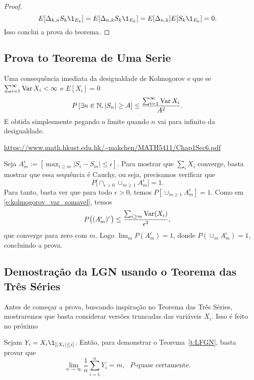 \begin{topics}
\begin{proof}
 \begin{equation}
   E[ \Delta_{k,n} S_k \1_{E_k}]=E[\Delta_{n,k}S_k \1_{E_k}]=E[\Delta_{n,k}]E[S_k \1_{E_k}]=0.
 \end{equation}
 Isso conclui a prova do teorema.
\end{proof}

\subsection{Prova to Teorema de Uma Serie}

Uma consequência imediata da desigualdade de Kolmogorov e que se \\ $\sum_{i=1}^{\infty} \operatorname{Var} X_i<\infty$ e $E[X_i]=0$
\begin{equation}
  \label{e:kolmogorov_var_somavel}
  P\left[ \exists n\in {\ensuremath{\mathbb N}},  |S_n| \ge A \right]
  \le \frac{\sum_{i=1}^{\infty} \operatorname{Var} X_i}{A^2}.
\end{equation}
E obtida simplesmente pegando o limite quando $n$ vai para infinito da desigualdade.


\url{https://www.math.hkust.edu.hk/~makchen/MATH5411/Chap1Sec6.pdf}

Seja $A_m^\epsilon := [ \max_{i \geq m} |S_i - S_m| \leq \epsilon ]$.
Para mostrar que $\sum_{i} X_i$ converge, basta mostrar que essa sequência é Cauchy, ou seja, precisamos verificar que
\begin{equation}
  P \big[ \cap_{\epsilon > 0} \cup_{m \geq 1} A_m^\epsilon \big] = 1.
\end{equation}
Para tanto, basta ver que para todo $\epsilon > 0$, temos $P [\cup_{m \geq 1} A_m^\epsilon] = 1$.
Como em \eqref{e:kolmogorov_var_somavel}, temos
\begin{equation}
  P \big( (A_m^\epsilon)^c \big) \leq \frac{\sum_{i \geq m} \operatorname{Var}(X_i)}{\epsilon^2},
\end{equation}
que converge para zero com $m$.
Logo $\lim_m P(A_m^\epsilon) = 1$, donde $P(\cup_m A_m^\epsilon) = 1$, concluindo a prova.

\subsection{Demostração da LGN usando o Teorema das Três Séries}

Antes de começar a prova, buscando inspiração no Teorema das Três Séries, mostraremos que basta considerar versões truncadas das variáveis $X_i$.
Isso é feito no próximo

\begin{lemma}
  \label{l:LFGN}
  Sejam $Y_i = X_i \1_{[|X_i| \leq i]}$.
  Então, para demonstrar o Teorema~\ref{t:LFGN}, basta provar que
  \begin{equation}
    \lim_{n \to \infty}\frac{1}{n} \sum_{i=1}^n Y_i = m, \text{ $P$-quase certamente.}
  \end{equation}
\end{lemma}


\end{topics}
